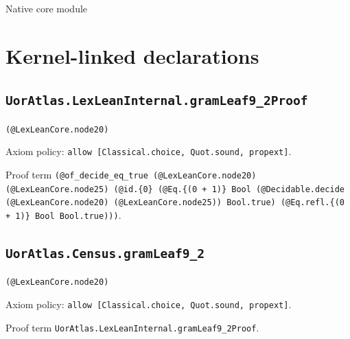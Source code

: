 \documentclass[11pt]{article}
\begin{document}
\begin{center}{\LARGE Native core module}\end{center}
\section*{Kernel-linked declarations}
\subsection*{\texttt{UorAtlas.LexLeanInternal.gramLeaf9\_2Proof}}
\noindent\texttt{(@LexLeanCore.node20)}\par
\noindent Axiom policy: \texttt{allow [Classical.choice, Quot.sound, propext]}.\par
\noindent Proof term \texttt{(@of\_decide\_eq\_true (@LexLeanCore.node20) (@LexLeanCore.node25) (@id.\{0\} (@Eq.\{(0 + 1)\} Bool (@Decidable.decide (@LexLeanCore.node20) (@LexLeanCore.node25)) Bool.true) (@Eq.refl.\{(0 + 1)\} Bool Bool.true)))}.\par
\subsection*{\texttt{UorAtlas.Census.gramLeaf9\_2}}
\noindent\texttt{(@LexLeanCore.node20)}\par
\noindent Axiom policy: \texttt{allow [Classical.choice, Quot.sound, propext]}.\par
\noindent Proof term \texttt{UorAtlas.LexLeanInternal.gramLeaf9\_2Proof}.\par
\end{document}
